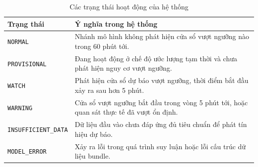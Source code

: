 \begin{table}[htbp]
        \centering
        \caption{Các trạng thái hoạt động của hệ thống}
        \vspace{0.2cm}
        \begin{tabular}{|p{4cm}|p{12cm}|}
            \hline
            \textbf{Trạng thái} & \textbf{Ý nghĩa trong hệ thống} \\
            \hline
            \texttt{NORMAL} & Nhánh mô hình không phát hiện cửa sổ vượt ngưỡng nào trong 60 phút tới. \\
            \hline
            \texttt{PROVISIONAL} & Đang hoạt động ở chế độ ước lượng tạm thời và chưa phát hiện nguy cơ vượt ngưỡng. \\
            \hline
            \texttt{WATCH} & Phát hiện cửa sổ dự báo vượt ngưỡng, thời điểm bắt đầu xảy ra sau hơn 5 phút. \\
            \hline
            \texttt{WARNING} & Cửa sổ vượt ngưỡng bắt đầu trong vòng 5 phút tới, hoặc quan sát thực tế đã vượt ổn định. \\
            \hline
            \texttt{INSUFFICIENT\_DATA} & Dữ liệu đầu vào chưa đáp ứng đủ tiêu chuẩn để phát tín hiệu dự báo. \\
            \hline
            \texttt{MODEL\_ERROR} & Xảy ra lỗi trong quá trình suy luận hoặc lỗi cấu trúc dữ liệu bundle. \\
            \hline
        \end{tabular}
    \end{table}